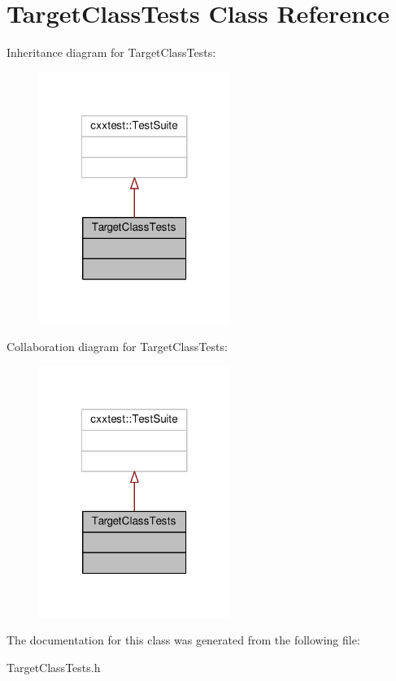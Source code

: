 \hypertarget{classTargetClassTests}{\section{Target\-Class\-Tests Class Reference}
\label{classTargetClassTests}
}


Inheritance diagram for Target\-Class\-Tests\-:\nopagebreak
\begin{figure}[H]
\begin{center}
\leavevmode
\includegraphics[width=176pt]{classTargetClassTests__inherit__graph}
\end{center}
\end{figure}


Collaboration diagram for Target\-Class\-Tests\-:\nopagebreak
\begin{figure}[H]
\begin{center}
\leavevmode
\includegraphics[width=176pt]{classTargetClassTests__coll__graph}
\end{center}
\end{figure}


The documentation for this class was generated from the following file\-:\begin{DoxyCompactItemize}
\item 
Target\-Class\-Tests.\-h\end{DoxyCompactItemize}
